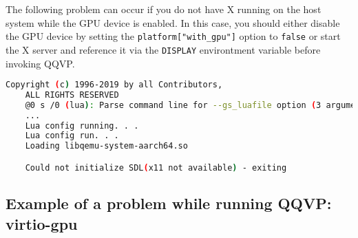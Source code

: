 The following problem can occur if you do not have X running on the host
system while the GPU device is enabled. In this case, you should either
disable the GPU device by setting the {\small{\lstinline!platform["with_gpu"]!}}
option to {\small{\lstinline!false!}} or start the X server and reference
it via the {\small{\lstinline!DISPLAY!}} environtment variable before invoking
QQVP.

\small
\begin{lstlisting}[language=bash]
    Copyright (c) 1996-2019 by all Contributors,
    ALL RIGHTS RESERVED
    @0 s /0 (lua): Parse command line for --gs_luafile option (3 arguments)
    ...
    Lua config running. . .
    Lua config run. . .
    Loading libqemu-system-aarch64.so

    Could not initialize SDL(x11 not available) - exiting
\end{lstlisting}
\normalsize

\subsection{Example of a problem while running QQVP: virtio-gpu}
\label{sec:virtioGPU}

